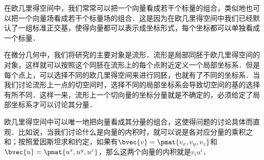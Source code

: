 
\begin{issues}
\issueTODO
\end{issues}



在欧几里得空间中，我们常常可以把一个向量看成若干个标量的组合，类似地也可以把一个向量场看成若干个标量场的组合．这是因为在欧几里得空间中我们已经默认了一组标准正交基，使得向量都可以表示成坐标形式，每个坐标都可以单独看成一个标量．

在微分几何中，我们将研究的主要对象是流形．流形是局部同胚于欧几里得空间的对象，这样就可以按照这个同胚在流形上的每个点附近定义一个局部坐标系．但是每个点上，可以选择不同的欧几里得空间来进行同胚，也就有了不同的坐标系．当我们讨论流形上一点的切空间时，选择不同的局部坐标系会导致切空间的基的选择有所不同．这样一来，流形上一个切向量的坐标分量就是不确定的，必须给定了局部坐标系才可以讨论其分量．

欧几里得空间中可以唯一地把向量看成其分量的组合，这使得问题的讨论具体而直观．比如说，当我们讨论什么是向量的内积时，就可以说是各对应分量的乘积之和；按照爱因斯坦求和约定，如果有$\bvec{v}=\pmat{v_x, v_y, v_z}$和$\bvec{u}=\pmat{u^x, u^y, u^z}$，那么这两个向量的内积就是$v_iu^i$．



